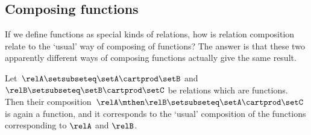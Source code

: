 \subsection{Composing functions}

If we define functions as special kinds of relations, how is relation composition relate to the `usual' way of composing of functions?
The answer is that these two apparently different ways of composing functions actually give the same result.

\begin{lemma}
    \label{lem:comprelfun}
    Let~$\relA \setsubseteq \setA \cartprod \setB$ and~$\relB \setsubseteq \setB \cartprod \setC$ be relations which are functions.
    Then their composition~$\relA \mthen \relB \setsubseteq \setA \cartprod \setC$ is again a function, and it corresponds to the `usual' composition of the functions corresponding to $\relA$ and $\relB$.
\end{lemma}

